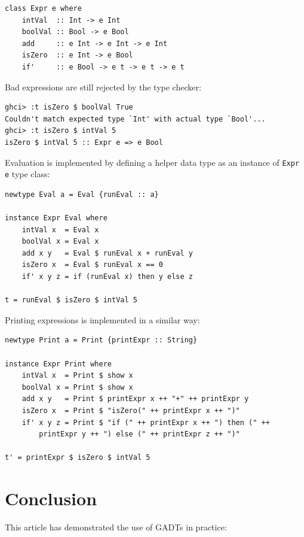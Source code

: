 \documentclass{tmr}
\begin{document}
\begin{Verbatim}
class Expr e where
    intVal  :: Int -> e Int
    boolVal :: Bool -> e Bool
    add     :: e Int -> e Int -> e Int
    isZero  :: e Int -> e Bool
    if'     :: e Bool -> e t -> e t -> e t
\end{Verbatim}

Bad expressions are still rejected by the type checker:

\begin{Verbatim}
ghci> :t isZero $ boolVal True
Couldn't match expected type `Int' with actual type `Bool'...
ghci> :t isZero $ intVal 5
isZero $ intVal 5 :: Expr e => e Bool
\end{Verbatim}

Evaluation is implemented by defining a helper data type as an instance of \verb|Expr e| type class:

\begin{Verbatim}
newtype Eval a = Eval {runEval :: a}

instance Expr Eval where
    intVal x  = Eval x
    boolVal x = Eval x
    add x y   = Eval $ runEval x + runEval y
    isZero x  = Eval $ runEval x == 0
    if' x y z = if (runEval x) then y else z 

t = runEval $ isZero $ intVal 5
\end{Verbatim}

Printing expressions is implemented in a similar way:

\begin{Verbatim}
newtype Print a = Print {printExpr :: String}

instance Expr Print where
    intVal x  = Print $ show x
    boolVal x = Print $ show x
    add x y   = Print $ printExpr x ++ "+" ++ printExpr y
    isZero x  = Print $ "isZero(" ++ printExpr x ++ ")"
    if' x y z = Print $ "if (" ++ printExpr x ++ ") then (" ++
        printExpr y ++ ") else (" ++ printExpr z ++ ")"

t' = printExpr $ isZero $ intVal 5
\end{Verbatim}

\section{Conclusion}
\label{sec:conclusion}

This article has demonstrated the use of GADTs in practice:
\end{document}
